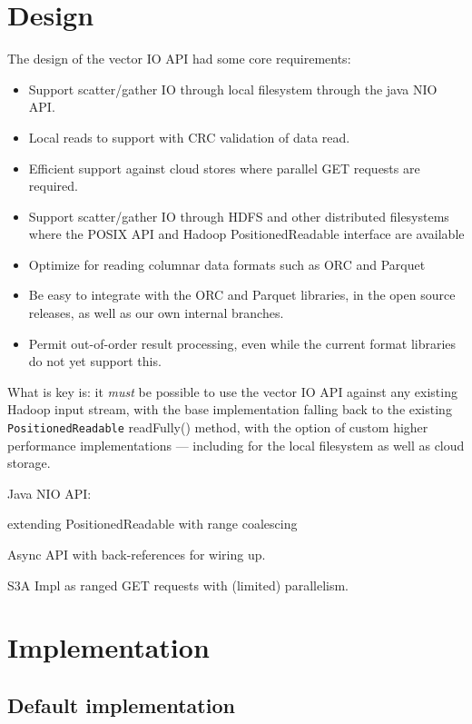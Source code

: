 \documentclass[manuscript]{acmart}
\begin{document}

\section{Design}
\label{sec:design}

The design of the vector IO API had some core requirements:
\begin{itemize}
  \item Support scatter/gather IO through local filesystem through the java NIO API.
  \item Local reads to support with CRC validation of data read.
  \item Efficient support against cloud stores where parallel GET requests are required.
  \item Support scatter/gather IO through HDFS and other distributed filesystems
        where the POSIX API and Hadoop PositionedReadable interface are available
  \item Optimize for reading columnar data formats such as ORC and Parquet
  \item Be easy to integrate with the ORC and Parquet libraries, in the open
        source releases, as well as our own internal branches.
  \item Permit out-of-order result processing, even while the current format libraries
        do not yet support this.
\end{itemize}

What is key is: it \emph{must} be possible to use the vector IO API against
any existing Hadoop input stream, with the base implementation
falling back to the existing \texttt{PositionedReadable} readFully() method,
with the option of custom higher performance implementations --- including
for the local filesystem as well as cloud storage.

Java NIO API:

extending PositionedReadable with range coalescing

Async API with back-references for wiring up.

S3A Impl as ranged GET requests with (limited) parallelism.

\section {Implementation}
\label{sec:implementation}

\subsection{Default implementation}
\end{document}
